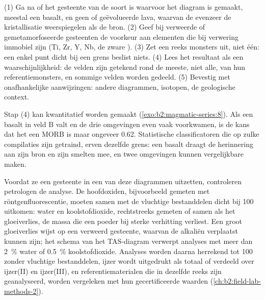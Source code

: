 \begin{method}\label{met:b2:magmatic-series:discrimination}
(1) Ga na of het gesteente van de soort is waarvoor het diagram is gemaakt, meestal een basalt, en
geen  of geëvolueerde lava, waarvan de  evenzeer de kristallisatie weerspiegelen
als de bron. (2) Geef bij verweerde of gemetamorfoseerde gesteenten de voorkeur aan elementen die bij verwering immobiel zijn (Ti, Zr, Y, Nb, de zware
). (3) Zet een reeks monsters uit, niet één:
een enkel punt dicht bij een grens beslist niets. (4) Lees het resultaat als een waarschijnlijkheid:
de velden zijn getekend rond de meeste, niet alle, van hun referentiemonsters, en sommige velden
worden gedeeld. (5) Bevestig met onafhankelijke aanwijzingen: andere diagrammen, isotopen, de
geologische context.
\end{method}

Stap (4) kan kwantitatief worden gemaakt (\cref{exo:b2:magmatic-series:8}). Als een basalt in veld B valt en de
drie omgevingen even vaak voorkwamen, is de kans dat het een MORB is maar ongeveer 0.62.
Statistische classificatoren die op zulke compilaties zijn getraind, erven dezelfde grens: een basalt
draagt de herinnering aan zijn bron en zijn smelten mee, en twee omgevingen kunnen vergelijkbare
 maken.

\begin{inthelab}
Voordat ze een gesteente in een van deze diagrammen uitzetten, controleren petrologen de analyse. De
hoofdoxiden, bijvoorbeeld gemeten met röntgenfluorescentie, moeten samen met de vluchtige bestanddelen
dicht bij 100 uitkomen: water en koolstofdioxide, rechtstreeks gemeten of samen als het
gloeiverlies, de massa die een poeder bij sterke verhitting verliest. Een groot
gloeiverlies wijst op een verweerd gesteente, waarvan de alkaliën verplaatst kunnen zijn; het schema van het
TAS-diagram verwerpt analyses met meer dan \qty{2}{\percent} water of
\qty{0.5}{\percent} koolstofdioxide. Analyses worden daarna herrekend tot 100 zonder
vluchtige bestanddelen, ijzer wordt uitgedrukt als totaal  of verdeeld over ijzer(II) en ijzer(III),
en referentiematerialen die in dezelfde reeks zijn geanalyseerd, worden vergeleken met hun gecertificeerde
waarden (\cref{ch:b2:field-lab-methods-2}).
\end{inthelab}

